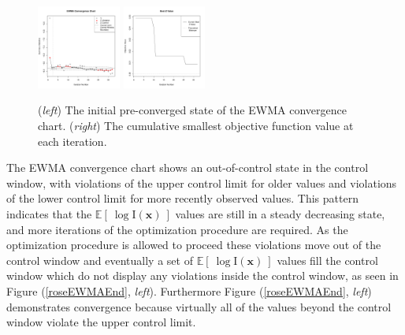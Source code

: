 \documentclass[12pt]{article}
\newcommand{\E}[1]{
        \mathbb{E}\left[~#1~\right]
}
\def \ix {
	\text{I}(\bm{x})
}
\begin{document}
	\clearpage
	\begin{figure}
	\vspace{-0.2cm}
	\includegraphics[width=0.245\textwidth]{./figures/ewmaConvChartRoseEasyEasyStart.pdf}
	\includegraphics[width=0.245\textwidth]{./figures/bestZRoseEasyEasyStart.pdf}
	\caption{({\it left}) The initial pre-converged state of the EWMA convergence chart. ({\it right}) The cumulative smallest objective function value at each iteration.}
	\label{roseEWMAStart}
	\end{figure}
	\noindent
	The EWMA convergence chart shows an out-of-control state in the control window, with violations of the upper control limit for older values and violations of the lower control limit for more recently observed values.
	This pattern indicates that the $\E{\log\ix}$ values are still in a steady decreasing state, and more iterations of the optimization procedure are required.
	As the optimization procedure is allowed to proceed these violations move out of the control window and eventually a set of $\E{\log\ix}$ values fill the control window which do not display any violations inside the control window, as seen in Figure (\ref{roseEWMAEnd}, {\it left}).
	Furthermore Figure (\ref{roseEWMAEnd}, {\it left}) demonstrates convergence because virtually all of the values beyond the control window violate the upper control limit.
	
\end{document}
